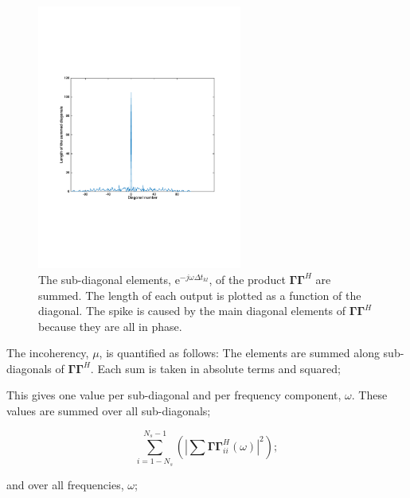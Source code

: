 \begin{figure}
	\centering
	\includegraphics[width=0.6\textwidth]{Plots/diagonal-sums}
	\caption{The sub-diagonal elements, $\mathrm{e}^{-j \omega \Delta t_{kl}}$, of the product $\mathbf{\Gamma \Gamma}^H$ are summed. The length of each output is plotted as a function of the diagonal. The spike is caused by the main diagonal elements of $\mathbf{\Gamma \Gamma}^H$ because they are all in phase.}
	\label{fig:Ch-Results-Diagonal-Sums}
\end{figure}

The incoherency, $\mu$, is quantified as follows: The elements are summed along sub-diagonals of $\mathbf{\Gamma \Gamma}^H$. Each sum is taken in absolute terms and squared;

This gives one value per sub-diagonal and per frequency component, $\omega$. These values are summed over all sub-diagonals;
 
 \begin{equation}
 	\sum_{i = 1-N_s}^{N_s-1}	 \left( \left| \sum \mathbf{\Gamma \Gamma}^H_{ii} (\omega) \right|^2 \right);
 	\label{eq:Ch-Results-incoherency-srcsum}
 \end{equation}
 
and over all frequencies, $\omega$;

